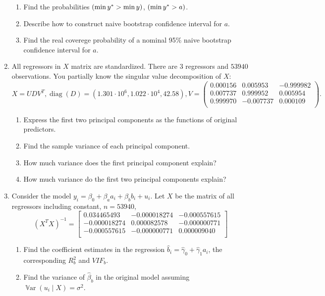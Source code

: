 \documentclass[12pt]{article}
\DeclareMathOperator{\Var}{\mathbb{V}ar}
\DeclareMathOperator{\diag}{diag}
\let\P\relax
\DeclareMathOperator{\P}{\mathbb{P}}
\newcommand{\hb}{\hat\beta}
\begin{document}
\begin{enumerate}
    \begin{enumerate}
        \item Find the probabilities $\P(\min y^* > \min y)$, $\P(\min y^* > a)$.
        \item Describe how to construct naive bootstrap confidence interval for $a$.
        \item Find the real coverege probability of a nominal 95\% naive bootstrap confidence interval for $a$. 
    \end{enumerate}

    
    \item All regressors in $X$ matrix are standardized. 
    There are $3$ regressors and $53940$ observations. 
    You partially know the singular value decomposition of $X$:
    \[
    X = UDV^T, \diag(D) = (1.301\cdot 10^6, 1.022 \cdot 10^4, 42.58),
    V = \begin{pmatrix}
        0.000156 & 0.005953 & -0.999982 \\ 
        0.007737 & 0.999952 & 0.005954 \\ 
        0.999970 & -0.007737 & 0.000109 \\ 
        \end{pmatrix}.
    \]
    \begin{enumerate}
        \item Express the first two principal components as the functions of original predictors.
        \item Find the sample variance of each principal component.
        \item How much variance does the first principal component explain?
        \item How much variance do the first two principal components explain?
    \end{enumerate}

    \item Consider the model $y_i = \beta_0 + \beta_a a_i + \beta_b b_i + u_i$.
    Let $X$ be the matrix of all regressors including constant, $n =  53940$,
    \[
    (X^TX)^{-1} = \begin{bmatrix}
        0.034465493 & -0.000018274 & -0.000557615 \\ 
        -0.000018274 & 0.000082578 & -0.000000771 \\ 
        -0.000557615 & -0.000000771 & 0.000009040 \\ 
         \end{bmatrix}    
    \]
    \begin{enumerate}
        \item Find the coefficient estimates in the regression $\hat{b}_i = \hat\gamma_0 + \hat\gamma_1 a_i$, 
        the corresponding $R^2_b$ and $VIF_b$.
        \item Find the variance of $\hb_b$ in the original model assuming $\Var(u_i \mid X) = \sigma^2$.
    \end{enumerate}



\end{enumerate}
\end{document}
